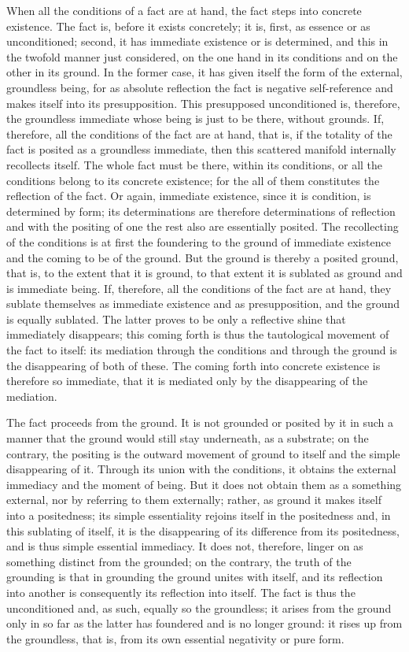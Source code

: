 When all the conditions of a fact are at hand,
the fact steps into concrete existence.
The fact is, before it exists concretely;
it is, first, as essence or as unconditioned;
second, it has immediate existence or is determined,
and this in the twofold manner just considered,
on the one hand in its conditions
and on the other in its ground.
In the former case, it has given itself the form
of the external, groundless being,
for as absolute reflection the fact is
negative self-reference
and makes itself into its presupposition.
This presupposed unconditioned is,
therefore, the groundless immediate
whose being is just to be there, without grounds.
If, therefore, all the conditions of the fact are at hand,
that is, if the totality of the fact is
posited as a groundless immediate,
then this scattered manifold
internally recollects itself.
The whole fact must be there,
within its conditions,
or all the conditions belong
to its concrete existence;
for the all of them constitutes
the reflection of the fact.
Or again, immediate existence,
since it is condition,
is determined by form;
its determinations are therefore determinations of reflection
and with the positing of one the rest also are essentially posited.
The recollecting of the conditions is at first
the foundering to the ground of immediate existence
and the coming to be of the ground.
But the ground is thereby a posited ground, that is,
to the extent that it is ground,
to that extent it is sublated as ground
and is immediate being.
If, therefore, all the conditions of the fact are at hand,
they sublate themselves as immediate existence and as presupposition,
and the ground is equally sublated.
The latter proves to be only a reflective shine
that immediately disappears;
this coming forth is thus the tautological movement
of the fact to itself:
its mediation through the conditions and through the ground
is the disappearing of both of these.
The coming forth into concrete existence is therefore so immediate,
that it is mediated only by the disappearing of the mediation.

The fact proceeds from the ground.
It is not grounded or posited by it
in such a manner that the ground
would still stay underneath, as a substrate;
on the contrary, the positing is
the outward movement of ground to itself
and the simple disappearing of it.
Through its union with the conditions,
it obtains the external immediacy
and the moment of being.
But it does not obtain them
as a something external,
nor by referring to them externally;
rather, as ground it makes
itself into a positedness;
its simple essentiality rejoins
itself in the positedness
and, in this sublating of itself,
it is the disappearing of
its difference from its positedness,
and is thus simple essential immediacy.
It does not, therefore, linger on
as something distinct from the grounded;
on the contrary, the truth of the grounding is
that in grounding the ground unites with itself,
and its reflection into another is
consequently its reflection into itself.
The fact is thus the unconditioned
and, as such, equally so the groundless;
it arises from the ground only in so far as
the latter has foundered and is no longer ground:
it rises up from the groundless, that is,
from its own essential negativity or pure form.

